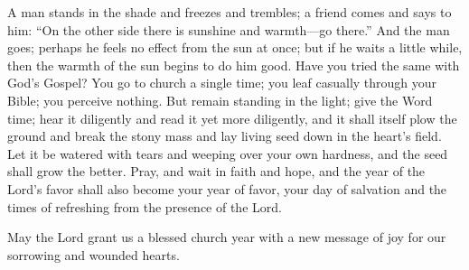 A man stands in the shade and freezes and trembles; a friend comes and says to him: “On the other side there is sunshine and warmth—go there.” And the man goes; perhaps he feels no effect from the sun at once; but if he waits a little while, then the warmth of the sun begins to do him good. Have you tried the same with God’s Gospel? You go to church a single time; you leaf casually through your Bible; you perceive nothing. But remain standing in the light; give the Word time; hear it diligently and read it yet more diligently, and it shall itself plow the ground and break the stony mass and lay living seed down in the heart’s field. Let it be watered with tears and weeping over your own hardness, and the seed shall grow the better. Pray, and wait in faith and hope, and the year of the Lord’s favor shall also become your year of favor, your day of salvation and the times of refreshing from the presence of the Lord.

May the Lord grant us a blessed church year with a new message of joy for our sorrowing and wounded hearts.
